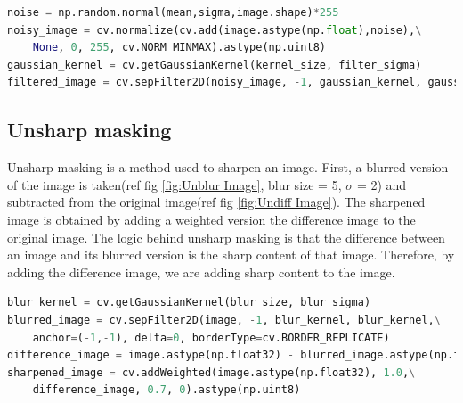 \documentclass[11pt, a4paper]{article}
\begin{document}
\begin{lstlisting}[language=python]
noise = np.random.normal(mean,sigma,image.shape)*255
noisy_image = cv.normalize(cv.add(image.astype(np.float),noise),\
	None, 0, 255, cv.NORM_MINMAX).astype(np.uint8)
gaussian_kernel = cv.getGaussianKernel(kernel_size, filter_sigma)
filtered_image = cv.sepFilter2D(noisy_image, -1, gaussian_kernel, gaussian_kernel)
\end{lstlisting}

\subsection{Unsharp masking}
Unsharp masking is a method used to sharpen an image. First, a blurred version of the image is taken(ref fig \ref{fig:Unblur Image}, blur size = 5, $\sigma$ = 2) and subtracted from the original image(ref fig \ref{fig:Undiff Image}). The sharpened image is obtained by adding a weighted version the difference image to the original image. The logic behind unsharp masking is that the difference between an image and its blurred version is the sharp content of that image. Therefore, by adding the difference image, we are adding sharp content to the image.

\begin{lstlisting}[language=python]
blur_kernel = cv.getGaussianKernel(blur_size, blur_sigma)
blurred_image = cv.sepFilter2D(image, -1, blur_kernel, blur_kernel,\
	anchor=(-1,-1), delta=0, borderType=cv.BORDER_REPLICATE)
difference_image = image.astype(np.float32) - blurred_image.astype(np.float32)
sharpened_image = cv.addWeighted(image.astype(np.float32), 1.0,\
	difference_image, 0.7, 0).astype(np.uint8)
\end{lstlisting}
\end{document}
